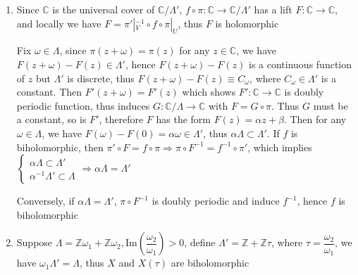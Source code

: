 \documentclass[main]{subfiles}
\begin{document}
\begin{solution}
\begin{enumerate}[label=\textbf{\arabic*.}, leftmargin=*]
\item Since $\mathbb{C}$ is the universal cover of \(\mathbb{C}/\Lambda'\), $f\circ\pi:\mathbb{C}\rightarrow \mathbb{C}/\Lambda'$ has a lift $F:\mathbb{C}\rightarrow \mathbb{C}$, and locally we have $F=\pi'|_{V}^{-1}\circ f\circ\pi|_{U}$, thus $F$ is holomorphic
\begin{center}
\end{center}
Fix \(\omega\in \Lambda\), since $\pi(z+\omega)=\pi(z)$ for any $z\in \mathbb{C}$, we have $F(z+\omega)-F(z)\in\Lambda'$, hence  \(F(z+\omega)-F(z)\) is a continuous function of $z$ but $\Lambda'$ is discrete, thus $F(z+\omega)-F(z)\equiv C_{\omega}$, where $C_{\omega}\in\Lambda'$ is a constant. Then $F'(z+\omega)=F'(z)$ which shows $F':\mathbb{C}\rightarrow \mathbb{C}$ is doubly periodic function, thus induces $G:\mathbb{C}/\Lambda\rightarrow \mathbb{C}$ with $F=G\circ\pi$. Thus $G$ must be a constant, so is $F'$, therefore $F$ has the form $F(z)=\alpha z+\beta$. Then for any $\omega\in \Lambda$, we have $F(\omega)-F(0)=\alpha\omega\in\Lambda'$, thus $\alpha\Lambda\subset\Lambda'$. If $f$ is biholomorphic, then $\pi'\circ F=f\circ\pi\Rightarrow \pi\circ F^{-1}=f^{-1}\circ\pi'$, which implies $\left\{\begin{array}{rl}
\alpha\Lambda\subset\Lambda' \\
\alpha^{-1}\Lambda'\subset\Lambda
\end{array}\right. \Rightarrow \alpha\Lambda=\Lambda'$
\begin{center}
\end{center}
Conversely, if \(\alpha\Lambda=\Lambda'\), $\pi\circ F^{-1}$ is doubly periodic and induce $f^{-1}$, hence $f$ is biholomorphic
\item Suppose $\Lambda=\mathbb{Z}\omega_{1}+\mathbb{Z}\omega_{2}, \mathrm{Im}\left(\dfrac{\omega_{2}}{\omega_{1}}\right)>0$, define $\Lambda'=\mathbb{Z}+\mathbb{Z}\tau$, where $\tau=\dfrac{\omega_{2}}{\omega_{1}}$, we have $\omega_{1}\Lambda'=\Lambda$, thus $X$ and $X(\tau)$ are biholomorphic

\end{enumerate}
\end{solution}
\end{document}
